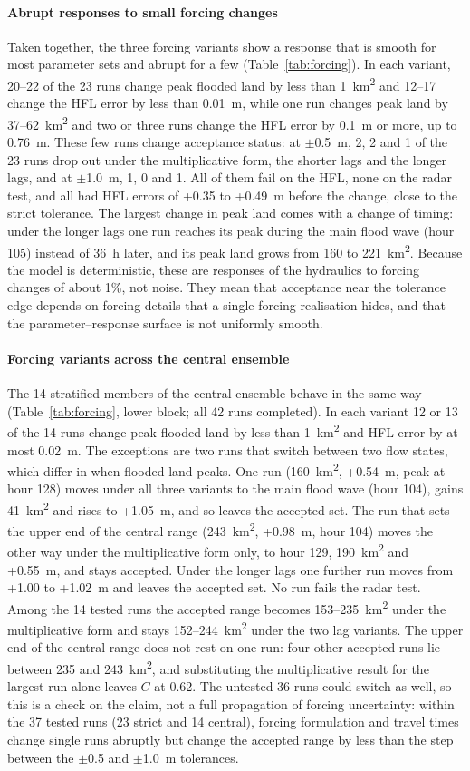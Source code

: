 \documentclass[preprint,12pt,authoryear]{elsarticle}
\newcommand{\kmsq}{km\textsuperscript{2}}
\begin{document}
\paragraph{Abrupt responses to small forcing changes} Taken together, the three forcing variants show a response that is smooth for most parameter sets and abrupt for a few (Table~\ref{tab:forcing}). In each variant, 20--22 of the 23 runs change peak flooded land by less than 1~\kmsq{} and 12--17 change the HFL error by less than 0.01~m, while one run changes peak land by 37--62~\kmsq{} and two or three runs change the HFL error by 0.1~m or more, up to 0.76~m. These few runs change acceptance status: at $\pm$0.5~m, 2, 2 and 1 of the 23 runs drop out under the multiplicative form, the shorter lags and the longer lags, and at $\pm$1.0~m, 1, 0 and 1. All of them fail on the HFL, none on the radar test, and all had HFL errors of +0.35 to +0.49~m before the change, close to the strict tolerance. The largest change in peak land comes with a change of timing: under the longer lags one run reaches its peak during the main flood wave (hour 105) instead of 36~h later, and its peak land grows from 160 to 221~\kmsq. Because the model is deterministic, these are responses of the hydraulics to forcing changes of about 1\%, not noise. They mean that acceptance near the tolerance edge depends on forcing details that a single forcing realisation hides, and that the parameter--response surface is not uniformly smooth.

\paragraph{Forcing variants across the central ensemble} The 14 stratified members of the central ensemble behave in the same way (Table~\ref{tab:forcing}, lower block; all 42 runs completed). In each variant 12 or 13 of the 14 runs change peak flooded land by less than 1~\kmsq{} and HFL error by at most 0.02~m. The exceptions are two runs that switch between two flow states, which differ in when flooded land peaks. One run (160~\kmsq, +0.54~m, peak at hour 128) moves under all three variants to the main flood wave (hour 104), gains 41~\kmsq{} and rises to +1.05~m, and so leaves the accepted set. The run that sets the upper end of the central range (243~\kmsq, +0.98~m, hour 104) moves the other way under the multiplicative form only, to hour 129, 190~\kmsq{} and +0.55~m, and stays accepted. Under the longer lags one further run moves from +1.00 to +1.02~m and leaves the accepted set. No run fails the radar test. Among the 14 tested runs the accepted range becomes 153--235~\kmsq{} under the multiplicative form and stays 152--244~\kmsq{} under the two lag variants. The upper end of the central range does not rest on one run: four other accepted runs lie between 235 and 243~\kmsq, and substituting the multiplicative result for the largest run alone leaves $C$ at 0.62. The untested 36 runs could switch as well, so this is a check on the claim, not a full propagation of forcing uncertainty: within the 37 tested runs (23 strict and 14 central), forcing formulation and travel times change single runs abruptly but change the accepted range by less than the step between the $\pm$0.5 and $\pm$1.0~m tolerances.
\end{document}
